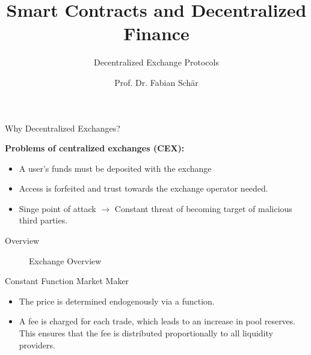 \documentclass[]{beamer}
\title{Smart Contracts and Decentralized Finance}
\subtitle{Decentralized Exchange Protocols}
\author{Prof. Dr. Fabian Schär}
\institute{University of Basel}
\begin{document}
\thispagestyle{empty}
\begin{frame}[noframenumbering]
	\titlepage
\end{frame}


\begin{frame}{Why Decentralized Exchanges?}

	\textbf{Problems of centralized exchanges (CEX):}
		\begin{small}
		\begin{itemize}
			\item A user's funds must be deposited with the exchange
			\item Access is forfeited and trust towards the exchange operator needed.
			\item Singe point of attack $\rightarrow$ Constant threat of becoming target of malicious third parties.
		\end{itemize}
		\end{small}	

\vspace{1.5em}

\end{frame}

\begin{frame}{Overview}
	\begin{figure}[h!]
		
		\caption*{Exchange Overview \cite{FS:21}}
	\end{figure}
\end{frame}	


\begin{frame}{Constant Function Market Maker}

	\begin{figure}	
		\centering
		
	\end{figure}

	\begin{itemize}
		\item<5-> The price is determined endogenously via a function.
		\item<6-> A fee is charged for each trade, which leads to an increase in pool reserves. This ensures that the fee is distributed proportionally to all liquidity providers.
	\end{itemize}


\end{frame}
\end{document}

